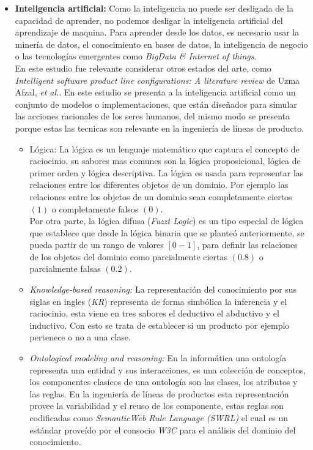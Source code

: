 \begin{itemize}
\item {\textbf{Inteligencia artificial:}}
Como la inteligencia no puede ser desligada de la capacidad de aprender, no podemos desligar la inteligencia artificial del aprendizaje de maquina. Para aprender desde los datos, es necesario usar la minería de datos,  el conocimiento en bases de datos, la inteligencia de negocio o las tecnologías emergentes como \textit{BigData \& Internet of things}.\cite{Hastie2009}\\
En este estudio fue relevante considerar otros estados del arte, como \textit{Intelligent software product line configurations: A literature review} de Uzma Afzal, \textit{et al.}\cite{Afzal2016}. En este estudio se presenta a la inteligencia artificial como un conjunto de modelos o implementaciones, que están diseñados para simular las acciones racionales de los seres humanos, del mismo modo se presenta porque estas las tecnicas son relevante en la ingeniería de líneas de producto.
\begin{itemize}
	\item {Lógica:}
	La lógica es un lenguaje matemático que captura el concepto de raciocinio, su sabores mas comunes son la lógica proposicional, lógica de primer orden y lógica descriptiva. La lógica es usada para representar las relaciones entre los diferentes objetos de un dominio. Por ejemplo las relaciones entre los objetos de un dominio sean completamente ciertos $(1)$ o completamente falsos $(0) $.\\
	Por otra parte, la lógica difusa (\textit{Fuzzt Logic}) es un tipo especial de lógica que establece que desde la lógica binaria que se planteó anteriormente, se pueda partir de un rango de valores $[0-1]$, para definir las relaciones de los objetos del dominio como parcialmente ciertas $(0.8)$ o parcialmente falsas $(0.2)$.
	\item {\textit{Knowledge-based reasoning:}}
	La representación del conocimiento por sus siglas en ingles (\textit{KR}) representa de forma simbólica la inferencia y el raciocinio, esta viene en tres sabores el deductivo el abductivo y el inductivo.  Con esto se trata de establecer si un producto por ejemplo pertenece o no a una clase. 
	\item {\textit{Ontological modeling and reasoning:}}
	En la informática una ontología representa una entidad y sus interacciones, es una colección de conceptos, los componentes clasicos de una ontología son las clases, los atributos y las reglas. En la ingeniería de líneas de productos esta representación provee la variabilidad y el reuso de los componente, estas reglas son codificadas como \textit{SemanticWeb Rule Language (SWRL)} el cual es un estándar proveído por el consocio \textit{W3C} para el análisis del dominio del conocimiento. 

\end{itemize}
\end{itemize}
